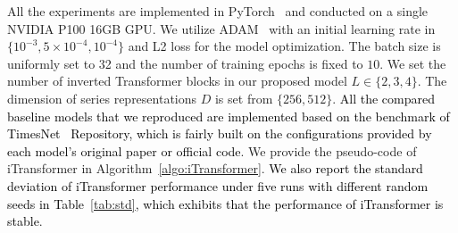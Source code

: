 \documentclass{article} %
\newcommand{\update}[1]{{\textcolor{black}{#1}}}
\begin{document}
All the experiments are implemented in PyTorch~\citep{Pytorch} and conducted on a single NVIDIA P100 16GB GPU. We utilize ADAM~\citep{Adam} with an initial learning rate in $\{10^{-3}, 5\times 10^{-4}, 10^{-4}\}$ and L2 loss for the model optimization. The batch size is uniformly set to 32 and the number of training epochs is fixed to $10$. We set the number of inverted Transformer blocks in our proposed model $L\in\{2, 3, 4\}$. The dimension of series representations $D$ is set from $\{256, 512\}$. \update{All the compared baseline models that we reproduced are implemented based on the benchmark of TimesNet~\citep{Timesnet} Repository, which is fairly built on the configurations provided by each model’s original paper or official code}. We provide the pseudo-code of iTransformer in  Algorithm~\ref{algo:iTransformer}. \update{We also report the standard deviation of iTransformer performance under five runs with different random seeds in Table~\ref{tab:std}, which exhibits that the performance of iTransformer is stable}.
\end{document}
